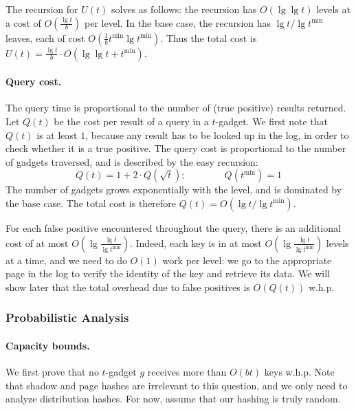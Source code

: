 \documentclass[letterpaper,11pt]{article}
\newcommand{\tmin}{t^{\min}}
\begin{document}
The recursion for $U(t)$ solves as follows: the recursion has
$O(\lg\lg t)$ levels at a cost of $O(\frac{\lg t}{b})$ per level. In
the base case, the recursion has $\lg t / \lg \tmin$ leaves, each of
cost $O(\frac{1}{b} \tmin \lg \tmin)$. Thus the total cost is $U(t)
= \frac{\lg t}{b} \cdot O(\lg\lg t + \tmin)$.




\paragraph{Query cost.}
The query time is proportional to the number of (true positive)
results returned. Let $Q(t)$ be the cost per result of a query in a
$t$-gadget. We first note that $Q(t)$ is at least $1$, because any
result has to be looked up in the log, in order to check whether it is a
true positive. The query cost is proportional to the
number of gadgets traversed, and is described by the easy recursion:
\[ Q(t) = 1 + 2\cdot Q(\sqrt{t});
\qquad \qquad Q(\tmin) = 1 \] 
The number of gadgets grows exponentially with the level, and is
dominated by the base case. The total cost is therefore $Q(t) = O(\lg
t / \lg \tmin)$.

For each false positive encountered throughout the query, there is an
additional cost of at most $O(\lg\frac{\lg t}{\lg \tmin})$. Indeed,
each key is in at most $O(\lg\frac{\lg t}{\lg\tmin})$ levels at a
time, and we need to do $O(1)$ work per level: we go to the
appropriate page in the log to verify the identity of the key and
retrieve its data. We will show later that the total overhead due to
false positives is $O(Q(t))$ w.h.p.



\subsubsection{Probabilistic Analysis} \label{s:prob}

\paragraph{Capacity bounds.}
We first prove that no $t$-gadget $g$ receives more than $O(bt)$ keys
w.h.p. Note that shadow and page hashes are irrelevant to this
question, and we only need to analyze distribution hashes. For now,
assume that our hashing is truly random.
\end{document}
